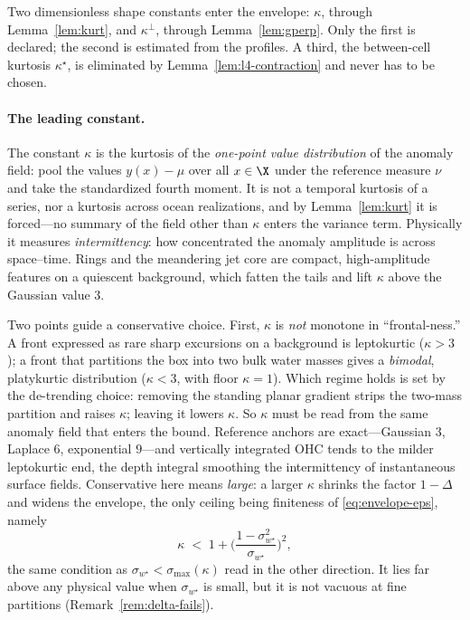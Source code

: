 \begin{remark}
\label{rem:kappa}
Two dimensionless shape constants enter the envelope: $\kappa$, through
Lemma~\ref{lem:kurt}, and $\kappa^{\perp}$, through
Lemma~\ref{lem:gperp}. Only the first is declared; the second is
estimated from the profiles. A third, the between-cell kurtosis
$\kappa^{\star}$, is eliminated by Lemma~\ref{lem:l4-contraction} and
never has to be chosen.

\paragraph*{The leading constant.}
The constant $\kappa$ is the kurtosis of the \emph{one-point value
distribution} of the anomaly field: pool the values $y(x)-\mu$ over all
$x\in\X$ under the reference measure $\nu$ and take the standardized
fourth moment. It is not a temporal kurtosis of a series, nor a kurtosis
across ocean realizations, and by Lemma~\ref{lem:kurt} it is
forced---no summary of the field other than $\kappa$ enters the variance
term. Physically it measures \emph{intermittency}: how concentrated the
anomaly amplitude is across space--time. Rings and the meandering jet
core are compact, high-amplitude features on a quiescent background,
which fatten the tails and lift $\kappa$ above the Gaussian value $3$.

Two points guide a conservative choice. First, $\kappa$ is \emph{not}
monotone in ``frontal-ness.'' A front expressed as rare sharp excursions
on a background is leptokurtic ($\kappa>3$); a front that partitions the
box into two bulk water masses gives a \emph{bimodal}, platykurtic
distribution ($\kappa<3$, with floor $\kappa=1$). Which regime holds is
set by the de-trending choice: removing the
standing planar gradient strips the two-mass partition and raises
$\kappa$; leaving it lowers $\kappa$. So $\kappa$ must be read from the
same anomaly field that enters the bound. Reference anchors are
exact---Gaussian $3$, Laplace $6$, exponential $9$---and vertically
integrated OHC tends to the milder leptokurtic end, the depth integral
smoothing the intermittency of instantaneous surface fields.
Conservative here means \emph{large}: a larger $\kappa$ shrinks the
factor $1-\Delta$ and widens the envelope, the only ceiling being
finiteness of \eqref{eq:envelope-eps}, namely
\[
  \kappa\;<\;1+\Big(\frac{1-\sigma_{w^{\star}}^2}{\sigma_{w^{\star}}}\Big)^{2},
\]
the same condition as $\sigma_{w^{\star}}<\sigma_{\max}(\kappa)$ read in
the other direction. It lies far above any physical value when
$\sigma_{w^{\star}}$ is small, but it is not vacuous at fine partitions
(Remark~\ref{rem:delta-fails}).


\end{remark}
